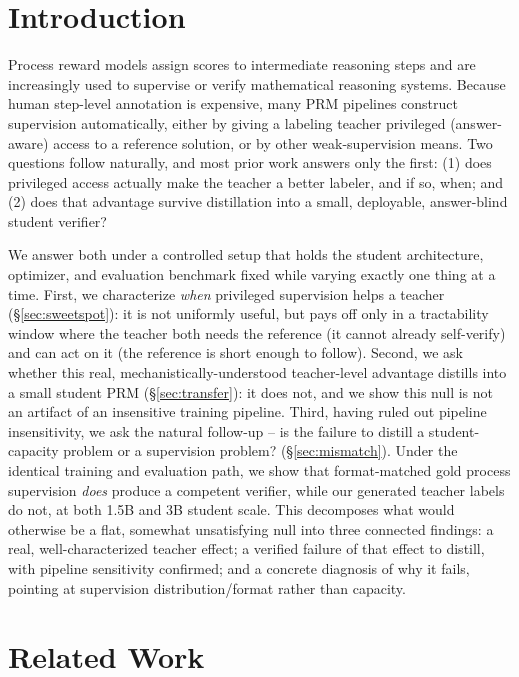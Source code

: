 \documentclass[11pt]{article}
\begin{document}
\section{Introduction}
\label{sec:intro}

Process reward models assign scores to intermediate reasoning steps and are
increasingly used to supervise or verify mathematical reasoning systems.
Because human step-level annotation is expensive, many PRM pipelines
construct supervision automatically, either by giving a labeling teacher
privileged (answer-aware) access to a reference solution, or by other
weak-supervision means. Two questions follow naturally, and most prior work
answers only the first: (1) does privileged access actually make the teacher
a better labeler, and if so, when; and (2) does that advantage survive
distillation into a small, deployable, answer-blind student verifier?

We answer both under a controlled setup that holds the student architecture,
optimizer, and evaluation benchmark fixed while varying exactly one thing at
a time. First, we characterize \emph{when} privileged supervision helps a
teacher (\S\ref{sec:sweetspot}): it is not uniformly useful, but pays off
only in a tractability window where the teacher both needs the reference (it
cannot already self-verify) and can act on it (the reference is short enough
to follow). Second, we ask whether this real, mechanistically-understood
teacher-level advantage distills into a small student PRM
(\S\ref{sec:transfer}): it does not, and we show this null is not an
artifact of an insensitive training pipeline. Third, having ruled out
pipeline insensitivity, we ask the natural follow-up -- is the failure to
distill a student-capacity problem or a supervision problem?
(\S\ref{sec:mismatch}). Under the identical training and evaluation path, we
show that format-matched gold process supervision \emph{does} produce a
competent verifier, while our generated teacher labels do not, at both 1.5B
and 3B student scale. This decomposes what would otherwise be a flat,
somewhat unsatisfying null into three connected findings: a real,
well-characterized teacher effect; a verified failure of that effect to
distill, with pipeline sensitivity confirmed; and a concrete diagnosis of
why it fails, pointing at supervision distribution/format rather than
capacity.

\section{Related Work}
\label{sec:related}
\end{document}
